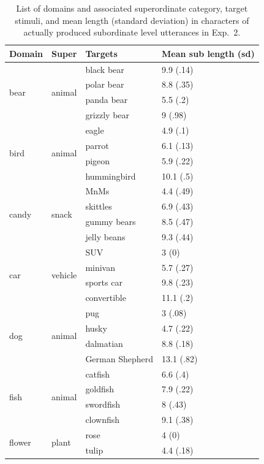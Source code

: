 \documentclass[11pt]{article}
\begin{document}
\begin{table}
\centering
\caption{List of domains and associated superordinate category, target stimuli, and mean length (standard deviation) in characters of actually produced subordinate level utterances in Exp.~2.}
	\label{tab:reflevelstimuli}
	\begin{tabular}{l l l l}
	\toprule
	Domain & Super & Targets & Mean sub length (sd)\\
	\midrule
	\multirow{4}{*}{bear} & \multirow{4}{*}{animal} & black bear & 9.9 (.14)\\
	& & polar bear & 8.8 (.35)\\
	& & panda bear & 5.5 (.2)\\
	& & grizzly bear & 9 (.98)\\
	\midrule
	\multirow{4}{*}{bird} & \multirow{4}{*}{animal} & eagle & 4.9 (.1)\\
	& 	& parrot & 6.1 (.13)\\
	& & pigeon & 5.9 (.22)\\
	& 	& hummingbird & 10.1 (.5)\\
	\midrule
	\multirow{4}{*}{candy} & \multirow{4}{*}{snack} & MnMs & 4.4 (.49)\\
		& & skittles & 6.9 (.43)\\
		& & gummy bears & 8.5 (.47)\\
		& & jelly beans & 9.3 (.44)\\
	\midrule
	\multirow{4}{*}{car} & \multirow{4}{*}{vehicle} & SUV & 3 (0)\\
		& & minivan & 5.7 (.27)\\
		& & sports car & 9.8 (.23)\\
		& & convertible & 11.1 (.2)\\
	\midrule
	\multirow{4}{*}{dog} & \multirow{4}{*}{animal} & pug & 3 (.08)\\
		& & husky & 4.7 (.22)\\
		& & dalmatian & 8.8 (.18)\\
		& & German Shepherd & 13.1 (.82)\\
	\midrule
	\multirow{4}{*}{fish} & \multirow{4}{*}{animal} & catfish & 6.6 (.4)\\
		& & goldfish & 7.9 (.22)\\
		& & swordfish & 8 (.43)\\
		& & clownfish & 9.1 (.38)\\
	\midrule
	\multirow{4}{*}{flower} & \multirow{4}{*}{plant} & rose & 4 (0)\\
		& & tulip & 4.4 (.18)\\

\end{tabular}
\end{table}
\end{document}

